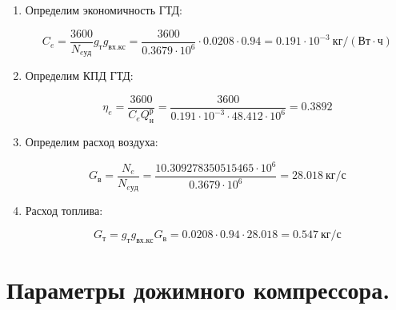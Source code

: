 \documentclass[a4paper,10pt]{article}
\begin{document}
\begin{enumerate}
	\item Определим экономичность ГТД:
	
	
	
	\[
	C_e = \frac{ 3600 }{ N_{e уд} } g_т g_{вх.кс} = 
			\frac{ 3600 }{ 0.3679 \cdot 10^6} \cdot 0.0208 \cdot 0.94 =
	0.191 \cdot 10^{-3}\ кг/\left( Вт \cdot ч \right)
	\]
	
	\item Определим КПД ГТД:
	
	\[
	\eta_e = \frac{ 3600 }{ C_e Q_н^р } = 
			\frac{ 3600 }{ 0.191 \cdot 10^{-3} \cdot 48.412 \cdot 10^6} 
	= 0.3892
	\]
	
	\item Определим расход воздуха:
	
	\[
	G_в = \frac{N_e}{N_{e уд} } = 
	\frac{ 10.309278350515465 \cdot 10^6 }{ 0.3679 \cdot 10^6 } = 
	28.018\ кг/с
	\]

	\item Расход топлива:

	\[
		G_{т} = g_т g_{вх.кс} G_в = 0.0208 \cdot 0.94
		\cdot 28.018 =
		0.547\ кг/с
	\]

\end{enumerate}




    \section{Параметры дожимного компрессора.}
\end{document}
